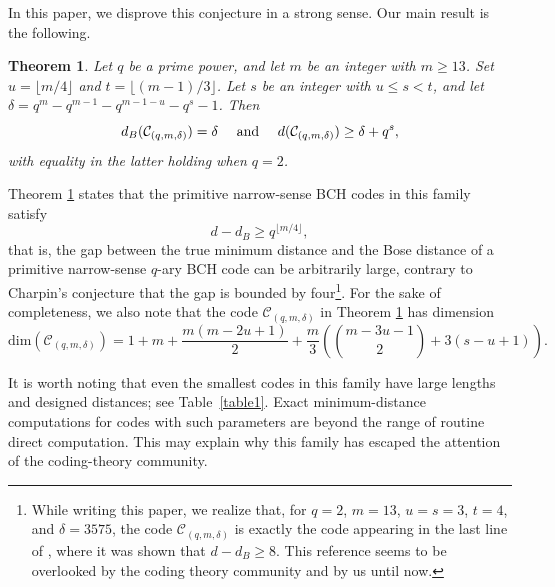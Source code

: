 \documentclass[journal,onecolumn]{IEEEtran}
\newtheorem{theorem}{Theorem}
\begin{document}
In this paper, we disprove this conjecture in a strong sense. Our main result is the following.
\begin{theorem}\label{mainth}
Let $q$ be a prime power, and let  $m$ be an integer with $m\ge 13$.  Set $u=\lfloor m/4\rfloor$ and
$t=\lfloor (m-1)/3\rfloor$. Let $s$ be an integer with $u\le s<t$, and let
$\delta=q^m-q^{m-1}-q^{m-1-u}-q^{s}-1$. Then
\begin{equation} \label{1:gapb}
d_B(\mathcal{C}_{(q,m,\delta)})=\delta\quad \hbox{ and }\quad 
  d(\mathcal{C}_{(q,m,\delta)}) \geq \delta+q^{s}, 
\end{equation}
with equality in the latter holding when $q = 2$.
\end{theorem} 



Theorem \ref{mainth} states that the primitive narrow-sense BCH codes in this family satisfy
\begin{equation*} 
    d-d_B\geq q^{\lfloor m/4 \rfloor},
\end{equation*}
that is, the gap between the true minimum distance and the Bose distance of a primitive narrow-sense $q$-ary BCH code can be arbitrarily large, contrary to Charpin's conjecture that the gap is bounded by four\footnote{While writing this paper, we realize that, for $q=2$, $m=13$, $u=s=3$, $t=4$, and $\delta=3575$, the code $\mathcal{C}_{(q,m,\delta)}$ is exactly the code appearing in the last line of \cite[Table I]{KT1969}, where it was shown that $d-d_B\geq 8$. This reference seems to be overlooked by the coding theory community and by us until now.}. For the sake of completeness, we also note that the code $\mathcal{C}_{(q,m,\delta)}$ in Theorem \ref{mainth} has dimension 
\begin{equation}\label{dimeq}
    \mathrm{dim}(\mathcal{C}_{(q,m,\delta)})\!=\!1+ m+\frac{m(m-2u+1)}{2}
+\frac{m}{3}
\left(
\binom{m-3u-1}{2}+3(s-u+1)
\right).
\end{equation}


It is worth noting that even the smallest codes in this family have large
lengths and designed distances; see Table~\ref{table1}. Exact
minimum-distance computations for codes with such parameters are beyond
the range of routine direct computation. This may explain why this family has   escaped the attention of the coding-theory
community.
\end{document}
